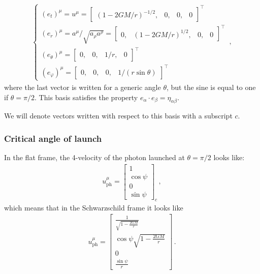 \documentclass[main.tex]{subfiles}
\begin{document}
\begin{align}
  \begin{cases}
    (e_{t})^{\mu } = u^{\mu } = \left[\begin{array}{cccc}
    (1-2GM/r)^{-1/2}, & 0, & 0, & 0
  \end{array}\right]^{\top} \\ 
    (e_{r})^{\mu } = a^{\mu } / \sqrt{a_{\rho } a^{\rho }}
  = \left[\begin{array}{cccc}
    0, & (1-2GM/r)^{1/2}, & 0, & 0
  \end{array}\right]^{\top}  \\
  (e_{\theta })^{\mu } = \left[\begin{array}{cccc}
  0, & 0, & 1/r, & 0
  \end{array}\right]^{\top} \\
  (e_{\varphi })^{\mu } = \left[\begin{array}{cccc}
  0, & 0, & 0, & 1/(r \sin \theta )
  \end{array}\right]^{\top}
\end{cases} 
\,,
\end{align}
%
where the last vector is written for a generic angle \(\theta \), but the sine is equal to one if \(\theta = \pi /2\). 
This basis satisfies the property \(e_{\alpha } \cdot e_{\beta } = \eta_{\alpha \beta }\). 

We will denote vectors written with respect to this basis with a subscript \(c\). 

\subsubsection{Critical angle of launch}

In the flat frame, the 4-velocity of the photon launched at \(\theta = \pi /2\) looks like: 
%
\begin{align}
  u^{\mu } _{\text{ph}} = \left[\begin{array}{c}
  1 \\ 
  \cos \psi  \\ 
  0 \\ 
  \sin \psi 
  \end{array}\right]_c
\,,
\end{align}
%
which means that in the Schwarzschild frame it looks like 
%
\begin{align}
  u^{\mu }_{\text{ph}} = \left[\begin{array}{c}
  \frac{1}{\sqrt{1-\frac{2GM}{r}}} \\ 
  \cos \psi \sqrt{1 - \frac{2GM}{r}} \\ 
  0 \\ 
  \frac{\sin \psi}{r} 
  \end{array}\right]
\,.
\end{align}
\end{document}
